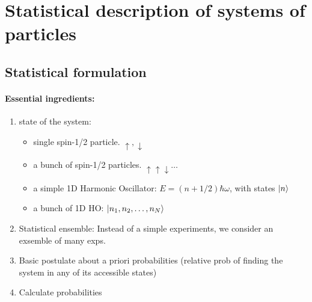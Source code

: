 \documentclass[../main.tex]{subfiles}
\begin{document}
\pagestyle{fancy}

\section{Statistical description of systems of particles}
\barh \vspace*{1em}

\subsection{Statistical formulation}
\paragraph*{Essential ingredients:}
\begin{enumerate}
    \item state of the system:
    \begin{itemize}
        \item single spin-1/2 particle. $\uparrow, \downarrow$
        \item a bunch of spin-1/2 particles. $\uparrow\uparrow\downarrow\dots$
        \item a simple 1D Harmonic Oscillator: $E = (n + 1/2) \hbar \omega$, with states $\ket{n}$
        \item a bunch of 1D HO: $\ket{n_1, n_2, \dots, n_N}$
    \end{itemize}
    \item Statistical ensemble: Instead of a simple experiments, we consider an exsemble of many exps.
    \item Basic postulate about a priori probabilities (relative prob of finding the system in any of its accessible states)
    \item Calculate probabilities
\end{enumerate}
\end{document}
